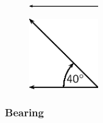    \addtocounter{footnote}{-0}
    
    \setcounter{subfigure}{0}


	\begin{figure}[H] %
    \begin{center}
    \label{m38812*id187358!!!underscore!!!media}\label{m38812*id187358!!!underscore!!!printimage}\includegraphics[width=3cm]{col11305.imgs/m38812_PG11C1_004.png} %
        
      \vspace{2pt}
    \vspace{.1in}
    
    \end{center}

 \end{figure}   

    \addtocounter{footnote}{-0}
    
    \setcounter{subfigure}{0}


	\begin{figure}[H] %
    \begin{center}
    \label{m38812*id187367!!!underscore!!!media}\label{m38812*id187367!!!underscore!!!printimage}\includegraphics[width=3cm]{col11305.imgs/m38812_PG11C1_005.png} %
        
      \vspace{2pt}
    \vspace{.1in}
    
    \end{center}

 \end{figure}   

    \addtocounter{footnote}{-0}
    \par 
      
      \label{m38812*uid7}
            \subsubsection{ Bearing}
            \nopagebreak
            
